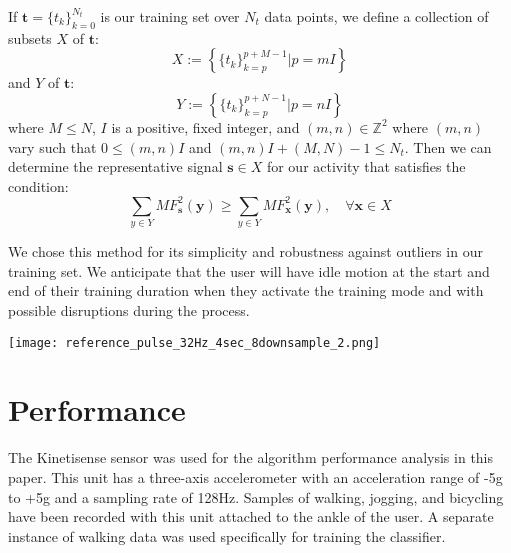 \documentclass{sciposter}
\begin{document}
\begin{multicols}{3}
If $\textbf{t} = \{t_k\}_{k=0}^{N_t}$ is our training set over $N_t$ data points, we define a collection of subsets $X$ of $\textbf{t}$:
%
\begin{equation} \label{eq:X_subsets_of_training_eq}
X := \left \{ \{t_k\}_{k=p}^{p+M-1} | p=mI \right \}
\end{equation}
%
and $Y$ of $\textbf{t}$:
%
\begin{equation} \label{eq:Y_subsets_of_training_eq}
Y := \left \{ \{t_k\}_{k=p}^{p+N-1} | p=nI \right \}
\end{equation}
%
where $M \leq N$, $I$ is a positive, fixed integer, and $(m,n) \in \mathbb{Z}^2$ where $(m,n)$ vary such that $0 \leq (m,n)I$ and $(m,n)I + (M,N) - 1 \leq N_t$. Then we can determine the representative signal $\textbf{s} \in X$ for our activity that satisfies the condition:
%
\begin{equation} \label{eq:s_condition}
\sum_{y \in Y}MF^2_{\textbf{s}}(\textbf{y}) \geq \sum_{y \in Y}MF^2_{\textbf{x}}(\textbf{y}), \quad \forall \textbf{x} \in X
\end{equation}

We chose this method for its simplicity and robustness against outliers in our training set. We anticipate that the user will have idle motion at the start and end of their training duration when they activate the training mode and with possible disruptions during the process.

\begin{center}
 \texttt{[image: reference\_pulse\_32Hz\_4sec\_8downsample\_2.png]}
\end{center}

\section{Performance}
The Kinetisense sensor was used for the algorithm performance analysis in this paper.
This unit has a three-axis accelerometer with an acceleration range of -5g to +5g and a sampling rate of 128Hz.
Samples of walking, jogging, and bicycling have been recorded with this unit attached to the ankle of the user.
A separate instance of walking data was used specifically for training the classifier.
%


\end{multicols}
\end{document}
